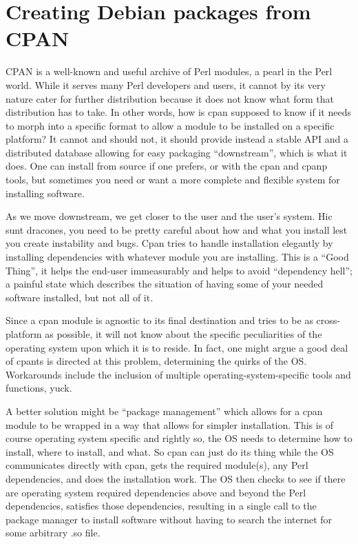\begin{savequote}
\end{savequote}
\chapter{Creating Debian packages from CPAN}
\label{c:debs_cpan}

CPAN is a well-known and useful archive of Perl modules, a pearl in the Perl
world. While it serves many Perl developers and users, it cannot by its very
nature cater for further distribution because it does not know what form that
distribution has to take. In other words, how is cpan supposed to know if it
needs to morph into a specif\hbox{}ic format to allow a module to be installed on a
specif\hbox{}ic platform? It cannot and should not, it should provide instead a stable
API and a distributed database allowing for easy packaging ``downstream'', which
is what it does. One can install from source if one prefers, or with the cpan
and cpanp tools, but sometimes you need or want a more complete and f\hbox{}lexible
system for installing software.

As we move downstream, we get closer to the user and the user's system. Hic sunt
dracones, you need to be pretty careful about how and what you install lest you
create instability and bugs. Cpan tries to handle installation elegantly by
installing dependencies with whatever module you are installing. This is a
``Good Thing\texttrademark'', it helps the end-user immeasurably and helps to
avoid ``dependency hell''; a painful state which describes the situation of
having some of your needed software installed, but not all of it.

Since a cpan module is agnostic to its f\hbox{}inal destination and tries to be as
cross-platform as possible, it will not know about the specif\hbox{}ic peculiarities of
the operating system upon which it is to reside. In fact, one might argue a good
deal of cpants is directed at this problem, determining the quirks of the OS.
Workarounds include the inclusion of multiple operating-system-specif\hbox{}ic tools
and functions, yuck. 

A better solution might be ``package management'' which allows for a cpan module
to be wrapped in a way that allows for simpler installation. This is of course
operating system specif\hbox{}ic and rightly so, the OS needs to  determine how to
install, where to install, and what. So cpan can just do its thing while the OS
communicates directly with cpan, gets the required module(s), any Perl
dependencies, and does the installation work. The OS then checks to see if there
are operating system required dependencies above and beyond the Perl
dependencies, satisf\hbox{}ies those dependencies, resulting in a single call to the
package manager to install software without having to search the internet for
some arbitrary .so f\hbox{}ile.

